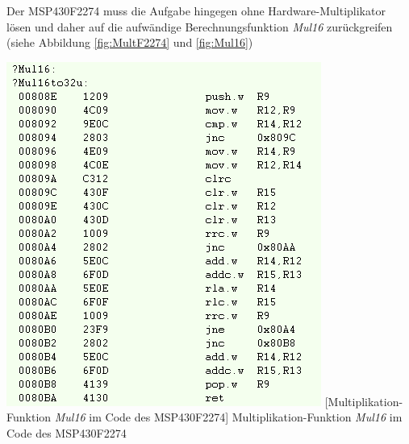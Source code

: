 \documentclass[12pt,a4paper,bibliography=totocnumbered,listof=totocnumbered]{scrartcl}
\begin{document}

Der MSP430F2274 muss die Aufgabe hingegen ohne Hardware-Multiplikator lösen und daher auf die aufwändige Berechnungsfunktion \textit{Mul16} zurückgreifen (siehe Abbildung \ref{fig:MultF2274} und \ref{fig:Mul16})


\vspace{1em}
\begin{minipage}{\linewidth}
	\centering
	\includegraphics[width=0.7\linewidth]{img/Mul16.png}
	[Multiplikation-Funktion \textit{Mul16} im Code des MSP430F2274] {Multiplikation-Funktion \textit{Mul16} im Code des MSP430F2274}
	\label{fig:Mul16}
\end{minipage}



\pagebreak



\renewcommand\refname{Quellenverzeichnis}

%
%

\pagebreak

\setcounter{page}{1}
\end{document}
